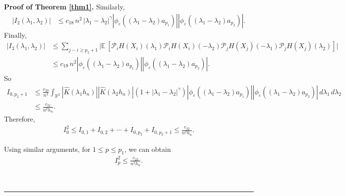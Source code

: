 \documentclass[11pt]{article}
\newenvironment{proof}[1][Proof]{\textbf{#1.} }{\
\rule{0.5em}{0.5em}}
\def\R{{\mathbb R}}
\def\E{{{\mathbb E}\,}}
\begin{document}
\begin{proof}[Proof of Theorem \ref{thm1}]
Similarly,
\begin{align*}
\left|I_2(\lambda_1,\lambda_2)\right|
&\leq c_{18}\, n^2\, |\lambda_1-\lambda_2|^{\gamma}  |\phi_{\varepsilon}((\lambda_1-\lambda_2)a_{p_1})| |\phi_{\varepsilon} ((\lambda_1-\lambda_2)a_{p_2}) |.
\end{align*}
Finally,
\begin{align*}
\left| I_3(\lambda_1,\lambda_2)\right|
&\leq \sum_{j-i\geq p_2+1} \Big| \E \left[\mathcal{P}_{i} H(X_{i})(\lambda_1)\mathcal{P}_{i} H(X_{i})(-\lambda_2)\mathcal{P}_j H(X_j)(-\lambda_1)\mathcal{P}_j H(X_j)(\lambda_2)\right] \Big|\\
&\leq c_{19}\, n^2 |\phi_{\varepsilon}((\lambda_1-\lambda_2)a_{p_1})||\phi_{\varepsilon} ((\lambda_1-\lambda_2)a_{p_2})|.
\end{align*}
So
\begin{align*}
I_{0,p_2+1}
&\leq \frac{c_{20}}{n^2} \int_{\R^2} |\widehat{K}(\lambda_1 h_n)| |\widehat{K}(\lambda_2 h_n)|(1+|\lambda_1-\lambda_2|^{\gamma})  |\phi_{\varepsilon}((\lambda_1-\lambda_2) a_{p_1})| |\phi_{\varepsilon} ((\lambda_1-\lambda_2) a_{p_2})| \, d\lambda_1\, d\lambda_2\\
&\leq \frac{c_{21}}{n^2h_n}.
\end{align*}
Therefore, 
\begin{align} \label{I1}
I^2_0\leq I_{0,1}+I_{0,2}+\cdots +I_{0, p_2}+ I_{0,p_2+1}\leq \frac{c_{22}}{n^2 h_n}.
\end{align}

Using similar arguments, for $1\le p\le p_1$, we can obtain 
\begin{align} \label{I2}
I^2_p\leq \frac{c_{23}}{ n^2 h_n}.
\end{align}


\end{proof}
\end{document}
